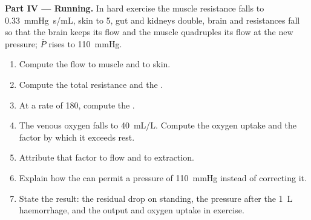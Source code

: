 \begin{problem}
\medskip
\noindent\textbf{Part IV --- Running.}
In hard exercise the muscle resistance falls to \qty{0.33}{mmHg.s/mL},
skin to 5, gut and kidneys double, brain and  resistances fall
so that the brain keeps its flow and the  muscle quadruples its
flow at the new pressure; $\bar P$ rises to \qty{110}{mmHg}.
\begin{enumerate}[resume]
  \item Compute the flow to muscle and to skin.
  \item Compute the total resistance and the .
  \item At a rate of 180, compute the .
  \item The venous oxygen falls to \qty{40}{mL/L}. Compute the oxygen
        uptake and the factor by which it exceeds rest.
  \item Attribute that factor to flow and to extraction.
  \item Explain how the  can permit a pressure of
        \qty{110}{mmHg} instead of correcting it.
  \item State the result: the residual drop on standing, the
        pressure after the \qty{1}{L} haemorrhage, and the output
        and oxygen uptake in exercise.
\end{enumerate}
\end{problem}
